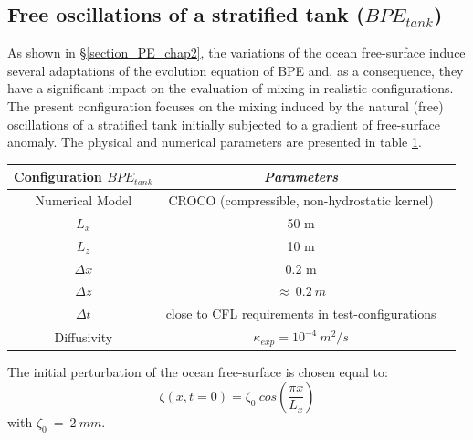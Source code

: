 \subsection{Free oscillations of a stratified tank ($BPE_{tank}$)}
As shown in \S \ref{section_PE_chap2}, the variations of the ocean free-surface induce several adaptations of the evolution equation of BPE and, as a consequence, they have a significant impact on the evaluation of mixing in realistic configurations. The present configuration focuses on the mixing induced by the natural (free) oscillations of a stratified tank initially subjected to a gradient of free-surface anomaly. The physical and numerical parameters are presented in table \ref{tab_BPE_TANK}.
\begin{table}[h]
        \centering
        \begin{tabular}{|c|c|c|}
                \hline
                Configuration $BPE_{tank}$ & \textit{Parameters}\\
                \hline 
                Numerical Model & CROCO (compressible, non-hydrostatic kernel)\\
                $L_x$ & 50 m\\
                $L_z$ & 10 m\\
                $\Delta x$ & 0.2 m\\
                $\Delta z$ & $\approx\ 0.2\ m$\\
                $\Delta t$ & close to CFL requirements in test-configurations\\
                Diffusivity & $\kappa_{exp} = 10^{-4} \ m^2/s$\\
                \hline
        \end{tabular}
        \label{tab_BPE_TANK}
\end{table}
The initial perturbation of the ocean free-surface is chosen equal to:
\begin{equation}
\displaystyle
\zeta(x,t=0)=\zeta_0\ cos\left(\frac{\pi x}{L_x}\right)
\end{equation}
with $\zeta_0\ =\ 2\ mm$.
